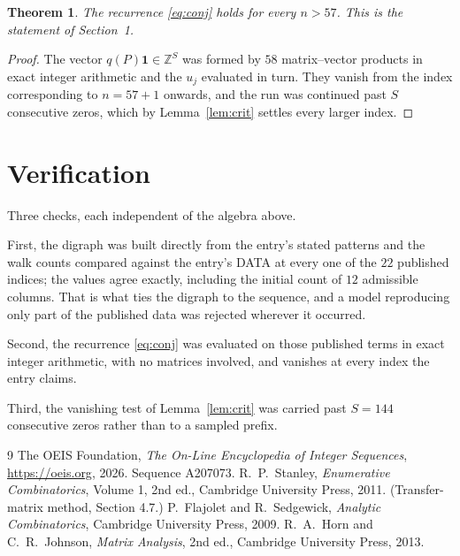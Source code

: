 \documentclass[11pt,a4paper]{article}
\theoremstyle{plain}
\newtheorem{theorem}{Theorem}
\theoremstyle{definition}
\begin{document}
\begin{theorem}
The recurrence \eqref{eq:conj} holds for every $n>57$. This is the statement of
Section~1.
\end{theorem}

\begin{proof}
The vector $q(P)\mathbf{1}\in\mathbb{Z}^{S}$ was formed by $58$ matrix--vector
products in exact integer arithmetic and the $u_j$ evaluated in turn. They vanish from the
index corresponding to $n=57+1$ onwards, and the run was continued past $S$ consecutive
zeros, which by Lemma~\ref{lem:crit} settles every larger index.
\end{proof}

\section{Verification}

Three checks, each independent of the algebra above.

First, the digraph was built directly from the entry's stated patterns and the walk counts
compared against the entry's DATA at every one of the $22$ published indices; the
values agree exactly, including the initial count of $12$ admissible columns. That is
what ties the digraph to the sequence, and a model reproducing only part of the published
data was rejected wherever it occurred.

Second, the recurrence \eqref{eq:conj} was evaluated on those published terms in exact
integer arithmetic, with no matrices involved, and vanishes at every index the entry claims.

Third, the vanishing test of Lemma~\ref{lem:crit} was carried past $S=144$ consecutive
zeros rather than to a sampled prefix.

\begin{thebibliography}{9}
 The OEIS Foundation, \emph{The On-Line Encyclopedia of Integer
Sequences}, \url{https://oeis.org}, 2026. Sequence A207073.
 R.~P.~Stanley, \emph{Enumerative Combinatorics}, Volume 1, 2nd ed.,
Cambridge University Press, 2011. (Transfer-matrix method, Section 4.7.)
 P.~Flajolet and R.~Sedgewick, \emph{Analytic Combinatorics}, Cambridge
University Press, 2009.
 R.~A.~Horn and C.~R.~Johnson, \emph{Matrix Analysis}, 2nd ed., Cambridge
University Press, 2013.
\end{thebibliography}
\end{document}
